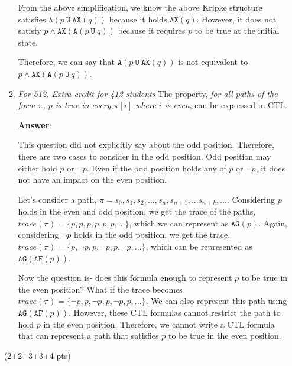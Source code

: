 \documentclass[11pt]{article}
\newcommand{\ax}[1]{\texttt{AX}(#1)}
\newcommand{\af}[1]{\texttt{AF}(#1)}
\newcommand{\ag}[1]{\texttt{AG}(#1)}
\newcommand{\au}[2]{\texttt{A}(#1\ \texttt{U}\ #2)}
\begin{document}
\begin{enumerate}
\begin{enumerate}
From the above simplification, we know the above Kripke structure satisfies $\au{p}{\ax{q}}$ because it holds $\ax{q}$. However, it does not satisfy $p \land \ax{\au{p}{q}}$ because it requires $p$ to be true at the initial state.  
  
Therefore, we can say that $\au{p}{\ax{q}}$ is not equivalent to $p \land \ax{\au{p}{q}}$.

    
  \item \emph{For 512. Extra credit for 412 students}
    The property, \emph{for all paths of the form $\pi$, $p$ is true in every $\pi[i]$ where $i$ is even},
    can be expressed in CTL.
    
     \textbf{Answer}: 
    

    This question did not explicitly say about the odd position. Therefore, there are two cases to consider in the odd position. 
    Odd position may either hold $p$ or $ \neg p$. Even if the odd position holds any of $p$ or $\neg p$, it does not have an impact on the even position. 

    Let's consider a path, $\pi = s_0, s_1, s_2, ..., s_n, s_{n+1}, ... s_{n+k}, ...$. Considering $p$ holds in the even and odd position, we get the trace of the paths, $trace(\pi)= \{p, p, p, p, p, p, ... \}$, which we can represent as $\ag{p}$. Again, considering $\neg p$ holds in the odd position, we get the trace, $trace(\pi) = \{p, \neg p, p, \neg p, p, \neg p, ... \}$, which can be represented as $\ag{\af{p}}$. 

    Now the question is- does this formula enough to represent $p$ to be true in the even position? What if the trace becomes $trace(\pi) = \{\neg p, p, \neg p, p, \neg p, p, ... \}$. We can also represent this path using $\ag{\af{p}}$. However, these CTL formulas cannot restrict the path to hold $p$ in the even position. Therefore, we cannot write a CTL formula that can represent a path that satisfies $p$ to be true in the even position. 

    
  \end{enumerate}
  \hfill (2+2+3+3+4 pts)
  
\end{enumerate}
\end{document}
